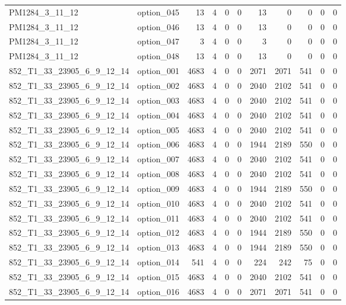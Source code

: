 \begin{tabular}{llrrrrrrrrr}
PM1284\_3\_11\_12 & option\_045 & 13 & 4 & 0 & 0 & 13 & 0 & 0 & 0 & 0 \\
PM1284\_3\_11\_12 & option\_046 & 13 & 4 & 0 & 0 & 13 & 0 & 0 & 0 & 0 \\
PM1284\_3\_11\_12 & option\_047 & 3 & 4 & 0 & 0 & 3 & 0 & 0 & 0 & 0 \\
PM1284\_3\_11\_12 & option\_048 & 13 & 4 & 0 & 0 & 13 & 0 & 0 & 0 & 0 \\
852\_T1\_33\_23905\_6\_9\_12\_14 & option\_001 & 4683 & 4 & 0 & 0 & 2071 & 2071 & 541 & 0 & 0 \\
852\_T1\_33\_23905\_6\_9\_12\_14 & option\_002 & 4683 & 4 & 0 & 0 & 2040 & 2102 & 541 & 0 & 0 \\
852\_T1\_33\_23905\_6\_9\_12\_14 & option\_003 & 4683 & 4 & 0 & 0 & 2040 & 2102 & 541 & 0 & 0 \\
852\_T1\_33\_23905\_6\_9\_12\_14 & option\_004 & 4683 & 4 & 0 & 0 & 2040 & 2102 & 541 & 0 & 0 \\
852\_T1\_33\_23905\_6\_9\_12\_14 & option\_005 & 4683 & 4 & 0 & 0 & 2040 & 2102 & 541 & 0 & 0 \\
852\_T1\_33\_23905\_6\_9\_12\_14 & option\_006 & 4683 & 4 & 0 & 0 & 1944 & 2189 & 550 & 0 & 0 \\
852\_T1\_33\_23905\_6\_9\_12\_14 & option\_007 & 4683 & 4 & 0 & 0 & 2040 & 2102 & 541 & 0 & 0 \\
852\_T1\_33\_23905\_6\_9\_12\_14 & option\_008 & 4683 & 4 & 0 & 0 & 2040 & 2102 & 541 & 0 & 0 \\
852\_T1\_33\_23905\_6\_9\_12\_14 & option\_009 & 4683 & 4 & 0 & 0 & 1944 & 2189 & 550 & 0 & 0 \\
852\_T1\_33\_23905\_6\_9\_12\_14 & option\_010 & 4683 & 4 & 0 & 0 & 2040 & 2102 & 541 & 0 & 0 \\
852\_T1\_33\_23905\_6\_9\_12\_14 & option\_011 & 4683 & 4 & 0 & 0 & 2040 & 2102 & 541 & 0 & 0 \\
852\_T1\_33\_23905\_6\_9\_12\_14 & option\_012 & 4683 & 4 & 0 & 0 & 1944 & 2189 & 550 & 0 & 0 \\
852\_T1\_33\_23905\_6\_9\_12\_14 & option\_013 & 4683 & 4 & 0 & 0 & 1944 & 2189 & 550 & 0 & 0 \\
852\_T1\_33\_23905\_6\_9\_12\_14 & option\_014 & 541 & 4 & 0 & 0 & 224 & 242 & 75 & 0 & 0 \\
852\_T1\_33\_23905\_6\_9\_12\_14 & option\_015 & 4683 & 4 & 0 & 0 & 2040 & 2102 & 541 & 0 & 0 \\
852\_T1\_33\_23905\_6\_9\_12\_14 & option\_016 & 4683 & 4 & 0 & 0 & 2071 & 2071 & 541 & 0 & 0 \\

\end{tabular}
